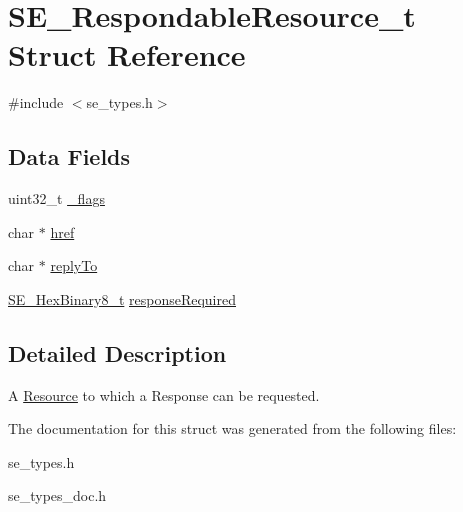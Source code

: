 \hypertarget{structSE__RespondableResource__t}{}\section{S\+E\+\_\+\+Respondable\+Resource\+\_\+t Struct Reference}
\label{structSE__RespondableResource__t}


{\ttfamily \#include $<$se\+\_\+types.\+h$>$}

\subsection*{Data Fields}
\begin{DoxyCompactItemize}
\item 
uint32\+\_\+t \hyperlink{group__RespondableResource_gafd63cff3cd9c63ab4d2a82f616d05873}{\+\_\+flags}
\item 
char $\ast$ \hyperlink{group__RespondableResource_gaad79f8e15991323308a92c3ddb5bcbfb}{href}
\item 
char $\ast$ \hyperlink{group__RespondableResource_ga68cb66f1c816c9977f400ea0d41ee9f4}{reply\+To}
\item 
\hyperlink{group__HexBinary8_gaecf2dab3615fb954a693c017a61f77d6}{S\+E\+\_\+\+Hex\+Binary8\+\_\+t} \hyperlink{group__RespondableResource_ga12d77f129ff2b72e1fd8c1de2ec7cb6c}{response\+Required}
\end{DoxyCompactItemize}


\subsection{Detailed Description}
A \hyperlink{structResource}{Resource} to which a Response can be requested. 

The documentation for this struct was generated from the following files\+:\begin{DoxyCompactItemize}
\item 
se\+\_\+types.\+h\item 
se\+\_\+types\+\_\+doc.\+h\end{DoxyCompactItemize}
